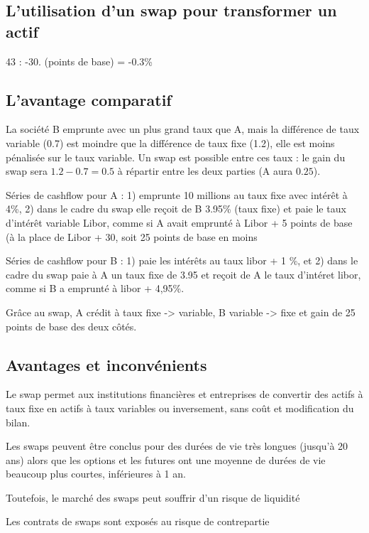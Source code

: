 
	\subsection{L'utilisation d'un swap pour transformer un actif}

	43 : -30. (points de base) = -0.3\%
	
	\subsection{L'avantage comparatif}
	
	La société B emprunte avec un plus grand taux que A, mais la différence de taux variable (0.7) est moindre que la différence de taux fixe (1.2), elle est moins pénalisée sur le taux variable. Un swap est possible entre ces taux : le gain du swap sera $1.2 - 0.7 = 0.5$ à répartir entre les deux parties (A aura $0.25$).
	
	Séries de cashflow pour A : 1) emprunte 10 millions au taux fixe avec intérêt à 4\%, 2) dans le cadre du swap elle reçoit de B 3.95\% (taux fixe) et paie le taux d'intérêt variable Libor, comme si A avait emprunté à Libor + 5 points de base (à la place de Libor + 30, soit 25 points de base en moins
	
	Séries de cashflow pour B : 1) paie les intérêts au taux libor + 1 \%, et 2) dans le cadre du swap paie à A un taux fixe de 3.95 et reçoit de A le taux d'intéret libor, comme si B a emprunté à libor + 4,95\%.

	Grâce au swap, A crédit à taux fixe -> variable, B variable -> fixe et  gain de 25 points de base des deux côtés.
	
	\subsection{Avantages et inconvénients}
	
	Le swap permet aux institutions financières et entreprises de convertir des actifs à taux fixe en actifs à taux variables ou inversement, sans coût et modification du bilan.

	Les swaps peuvent être conclus pour des durées de vie très longues (jusqu'à 20 ans) alors que les options et les futures ont une moyenne de durées de vie beaucoup plus courtes, inférieures à 1 an.
	
	Toutefois, le marché des swaps peut souffrir d’un risque de liquidité 
	
	Les contrats de swaps sont exposés au risque de contrepartie 


